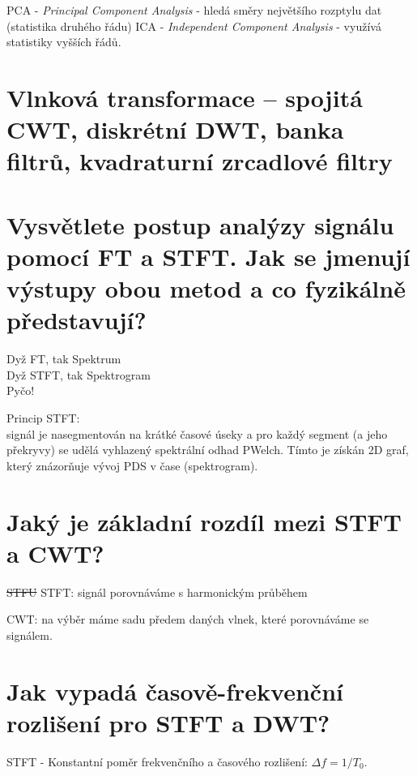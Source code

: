 \documentclass[a4paper,12pt]{article}   %
\newcommand{\mt}[1]{$#1$}
\newcommand{\okruh}[1]{\section*{\Large #1}}
\begin{document}
\begin{outline}
        \1 PCA - \textit{Principal Component Analysis} - hledá směry největšího rozptylu dat (statistika druhého řádu)
        \1 ICA - \textit{Independent Component Analysis} - využívá statistiky vyšších řádů.
\end{outline}



\clearpage 
{} %
\okruh{Vlnková transformace – spojitá CWT, diskrétní DWT, banka filtrů, kvadraturní zrcadlové filtry}

\section{Vysvětlete postup analýzy signálu pomocí FT a STFT. Jak se jmenují výstupy obou metod a co fyzikálně představují?}
Dyž FT, tak Spektrum\\
Dyž STFT, tak Spektrogram\\
Pyčo!

Princip STFT:\\
signál je nasegmentován na krátké časové úseky a pro každý segment (a jeho překryvy) se udělá vyhlazený spektrální odhad PWelch. Tímto je získán 2D graf, který znázorňuje vývoj PDS v čase (spektrogram).


\section{Jaký je základní rozdíl mezi STFT a CWT?}
\sout{STFU} STFT: signál porovnáváme s harmonickým průběhem

CWT: na výběr máme sadu předem daných vlnek, které porovnáváme se signálem. 

\section{Jak vypadá časově-frekvenční rozlišení pro STFT a DWT?}
STFT - Konstantní poměr frekvenčního a časového rozlišení: \mt{\Delta f = 1/T_0}.
\end{document}
